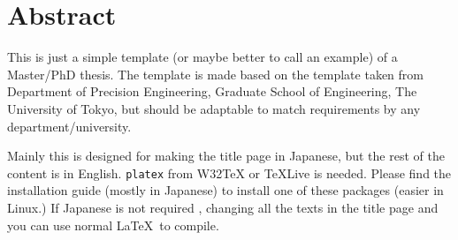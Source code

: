 \chapter*{Abstract}
This is just a simple template (or maybe better to call an example) of a Master/PhD thesis. The template is made based on the template taken from Department of Precision Engineering, Graduate School of Engineering, The University of Tokyo, but should be adaptable to match requirements by any department/university.

Mainly this is designed for making the title page in Japanese, but the rest of the content is in English. \texttt{platex} from W32TeX or TeXLive is needed. Please find the installation guide (mostly in Japanese) to install one of these packages (easier in Linux.) If Japanese is not required , changing all the texts in the title page and you can use normal \LaTeX\ to compile.